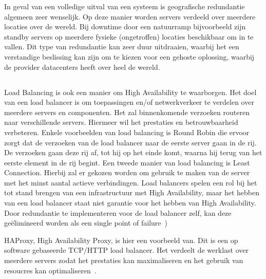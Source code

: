 In geval van een volledige uitval van een systeem is geografische redundantie algemeen zeer wenselijk. Op deze manier worden servers verdeeld over meerdere locaties over de wereld. Bij downtime door een natuurramp bijvoorbeeld zijn standby servers op meerdere fysieke (ongetroffen) locaties beschikbaar om in te vallen. Dit type van redundantie kan zeer duur uitdraaien, waarbij het een verstandige beslissing kan zijn om te kiezen voor een gehoste oplossing, waarbij de provider datacenters heeft over heel de wereld.

\subsection{}
\label{subsec:Load Balancing}

Load Balancing is ook een manier om High Availability te waarborgen. Het doel van een load balancer is om toepassingen en/of netwerkverkeer te verdelen over meerdere servers en componenten. Het zal binnenkomende verzoeken routeren naar verschillende servers. Hiermeer wil het prestaties en betrouwbaarheid verbeteren. Enkele voorbeelden van load balancing is Round Robin die ervoor zorgt dat de verzoeken van de load balancer naar de eerste server gaan in de rij. De verzoeken gaan deze rij af, tot hij op het einde komt, waarna hij terug van het eerste element in de rij begint. Een tweede manier van load balancing is Least Connection. Hierbij zal er gekozen worden om gebruik te maken van de server met het minst aantal actieve verbindingen. Load balancers spelen een rol bij het tot stand brengen van een infrastructuur met High Availability, maar het hebben van een load balancer staat niet garantie voor het hebben van High Availability. Door redundantie te implementeren voor de load balancer zelf, kan deze geëlimineerd worden als een single point of failure~\autocite{Jevtic2018})

HAProxy, High Availability Proxy, is hier een voorbeeld van. Dit is een op software gebaseerde TCP/HTTP load balancer. Het verdeelt de werklast over meerdere servers zodat het prestaties kan maximaliseren en het gebruik van resoucres kan optimaliseren~\autocite{SeveralNines2020}.

\subsection{}
\label{subsec:Schaalbaarheid}

